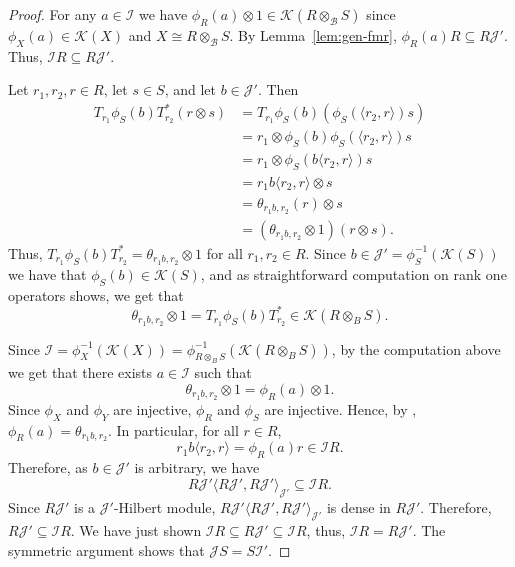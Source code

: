 \documentclass[11pt, letterpaper,final]{amsart}
\newcommand{\B}{{\mathcal{B}}}
\newcommand{\I}{{\mathcal{I}}}
\newcommand{\J}{{\mathcal{J}}}
\newcommand{\K}{{\mathcal{K}}}
\theoremstyle{definition}
\begin{document}
\begin{proof}
For any $a \in \I$ we have $\phi_{R} (a) \otimes 1 \in \K ( R \otimes_{\B} S)$ since $\phi_X( a) \in \K(X)$ and $X \cong R \otimes_{\B} S$.  By Lemma~\ref{lem:gen-fmr}, $\phi_R(a)R \subseteq R\J'$.  Thus, $\I R \subseteq R\J'$.  

Let $r_1, r_2, r \in R$, let $s \in S$, and let $b \in \J'$.  Then
\begin{align*}
    T_{r_1} \phi_S(b) T_{r_2}^* ( r \otimes s) &= T_{r_1} \phi_S(b) ( \phi_S ( \langle r_2, r \rangle ) s ) \\
            &= r_1 \otimes \phi_S(b) \phi_S ( \langle r_2, r \rangle ) s \\
            &= r_1 \otimes \phi_S ( b \langle r_2, r\rangle) s \\
            &= r_1 b \langle r_2, r\rangle \otimes s \\
            &= \theta_{ r_1 b , r_2 }(r) \otimes s \\
            &= (\theta_{r_1 b , r_2 } \otimes 1) ( r \otimes s ).
\end{align*}
Thus, $T_{r_1} \phi_S(b) T_{r_2}^*= \theta_{r_1 b , r_2 } \otimes 1$ for all $r_1, r_2 \in R$.  Since $b \in \J' = \phi_S^{-1} ( \K(S))$ we have that $\phi_S(b) \in \K(S)$, and as straightforward computation on rank one operators shows, we get that
$$
\theta_{r_1 b , r_2 }\otimes 1= T_{r_1} \phi_S(b) T_{r_2}^* \in \K( R \otimes_B S).
$$

Since $\I = \phi_X^{-1} ( \K(X)) = \phi_{R \otimes_B S}^{-1}( \K( R \otimes_B S))$, by the computation above we get that there exists $a \in \I$ such that
$$
\theta_{r_1 b , r_2 }\otimes 1 = \phi_R(a) \otimes 1.
$$
Since $\phi_X$ and $\phi_Y$ are injective, $\phi_R$ and $\phi_S$ are injective. Hence, by \cite[Lemma~4.2]{FMR-IUMJ2003}, $\phi_R(a) = \theta_{r_1 b , r_2 }$.  In particular, for all $r \in R$,
$$
r_1b \langle r_2, r \rangle = \phi_R(a) r \in \I R.
$$
Therefore, as $b\in \J'$ is arbitrary, we have
$$
R\J' \langle R\J', R\J' \rangle_{\J'} \subseteq \I R.
$$
Since $R\J'$ is a $\J'$-Hilbert module, $R\J' \langle R\J' , R\J' \rangle_{\J'}$ is dense in $R\J'$.  Therefore, $R\J' \subseteq \I R$.  We have just shown $\I R \subseteq R\J' \subseteq \I R$, thus, $\I R=R\J'$.  The symmetric argument shows that $\J S = S\I'$.
\end{proof}
\end{document}
